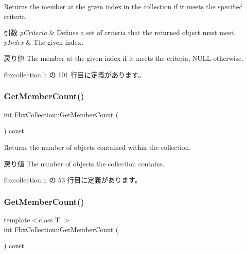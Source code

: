 Returns the member at the given index in the collection if it meets the specified criteria. 
\begin{DoxyParams}{引数}
{\em p\+Criteria} & Defines a set of criteria that the returned object must meet. \\
\hline
{\em p\+Index} & The given index. \\
\hline
\end{DoxyParams}
\begin{DoxyReturn}{戻り値}
The member at the given index if it meets the criteria; N\+U\+LL otherwise. 
\end{DoxyReturn}


 fbxcollection.\+h の 101 行目に定義があります。

\mbox{\label{class_fbx_collection_a3e22b8afd7b46dcc4988c2723dd75e02}} 
\subsubsection{\texorpdfstring{Get\+Member\+Count()}{GetMemberCount()}\hspace{0.1cm}{\footnotesize\ttfamily [1/3]}}
{\footnotesize\ttfamily int Fbx\+Collection\+::\+Get\+Member\+Count (\begin{DoxyParamCaption}{ }\end{DoxyParamCaption}) const\hspace{0.3cm}{\ttfamily [inline]}}

Returns the number of objects contained within the collection. \begin{DoxyReturn}{戻り値}
The number of objects the collection contains. 
\end{DoxyReturn}


 fbxcollection.\+h の 53 行目に定義があります。

\mbox{\label{class_fbx_collection_a0bc6b29ae68a76d65c554c7217432cca}} 
\subsubsection{\texorpdfstring{Get\+Member\+Count()}{GetMemberCount()}\hspace{0.1cm}{\footnotesize\ttfamily [2/3]}}
{\footnotesize\ttfamily template$<$class T $>$ \\
int Fbx\+Collection\+::\+Get\+Member\+Count (\begin{DoxyParamCaption}{ }\end{DoxyParamCaption}) const\hspace{0.3cm}{\ttfamily [inline]}}

